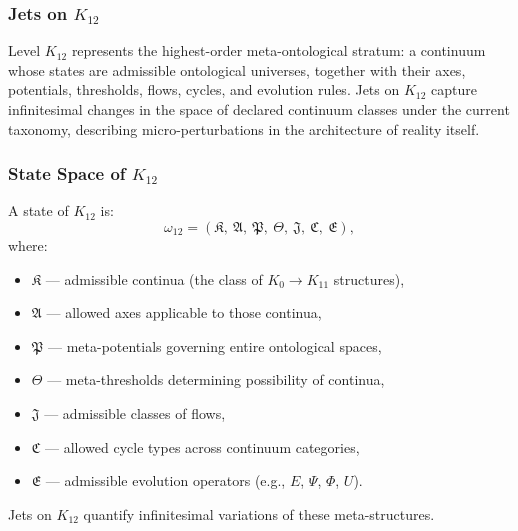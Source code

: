 
\subsubsection{Jets on $K_{12}$}
\label{sec:jets-k12}

Level $K_{12}$ represents the highest-order meta-ontological stratum:
a continuum whose states are admissible ontological universes,
together with their axes, potentials, thresholds, flows, cycles, and
evolution rules. Jets on $K_{12}$ capture infinitesimal changes in the
space of declared continuum classes under the current taxonomy, describing micro-perturbations in the
architecture of reality itself.


\subsubsection{State Space of $K_{12}$}

A state of $K_{12}$ is:
\[
\omega_{12} =
(\mathfrak{K},\ \mathfrak{A},\ \mathfrak{P},\ \mathfrak{\Theta},\ 
 \mathfrak{J},\ \mathfrak{C},\ \mathfrak{E}),
\]
where:
\begin{itemize}
    \item $\mathfrak{K}$ — admissible continua (the class of $K_0\!\to\!K_{11}$ structures),
    \item $\mathfrak{A}$ — allowed axes applicable to those continua,
    \item $\mathfrak{P}$ — meta-potentials governing entire ontological spaces,
    \item $\mathfrak{\Theta}$ — meta-thresholds determining possibility of continua,
    \item $\mathfrak{J}$ — admissible classes of flows,
    \item $\mathfrak{C}$ — allowed cycle types across continuum categories,
    \item $\mathfrak{E}$ — admissible evolution operators (e.g., $E$, $\Psi$, $\Phi$, $U$).
\end{itemize}

Jets on $K_{12}$ quantify infinitesimal variations of these meta-structures.


